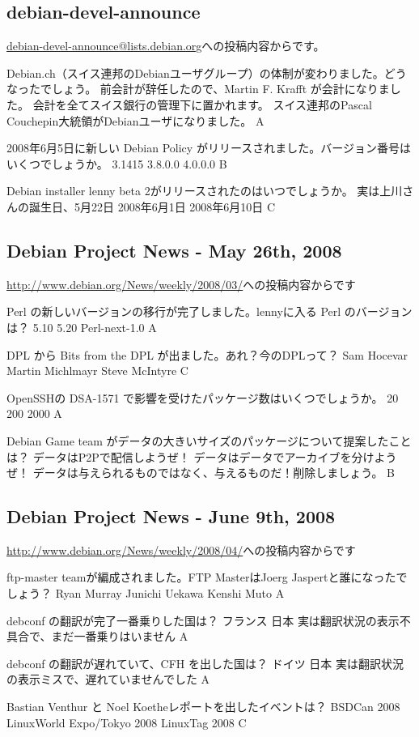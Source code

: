 \documentclass[mingoth,a4paper]{jsarticle}
\begin{document}
\begin{multicols}{2}
 \subsection{debian-devel-announce}
 \url{debian-devel-announce@lists.debian.org}への投稿内容からです。

 \santaku
 {Debian.ch（スイス連邦のDebianユーザグループ）の体制が変わりました。どうなったでしょう。}
 {前会計が辞任したので、Martin F. Krafft が会計になりました。}
 {会計を全てスイス銀行の管理下に置かれます。}
 {スイス連邦のPascal Couchepin大統領がDebianユーザになりました。}
 {A}

 \santaku
 {2008年6月5日に新しい Debian Policy がリリースされました。バージョン番号はいくつでしょうか。}
 {3.1415}
 {3.8.0.0}
 {4.0.0.0}
 {B}
 
 \santaku
 {Debian installer lenny beta 2がリリースされたのはいつでしょうか。}
 {実は上川さんの誕生日、5月22日}
 {2008年6月1日}
 {2008年6月10日}
 {C}

 \subsection{Debian Project News - May 26th, 2008}
 \url{http://www.debian.org/News/weekly/2008/03/}への投稿内容からです

 \santaku
 {Perl の新しいバージョンの移行が完了しました。lennyに入る Perl のバージョンは？ }
 {5.10}
 {5.20}
 {Perl-next-1.0}
 {A}

 \santaku
 {DPL から Bits from the DPL が出ました。あれ？今のDPLって？}
 {Sam Hocevar}
 {Martin Michlmayr}
 {Steve McIntyre}
 {C}

 \santaku
 {OpenSSHの DSA-1571 で影響を受けたパッケージ数はいくつでしょうか。}
 {20}
 {200}
 {2000}
 {A}

 \santaku
 {Debian Game team がデータの大きいサイズのパッケージについて提案したことは？}
 {データはP2Pで配信しようぜ！}
 {データはデータでアーカイブを分けようぜ！}
 {データは与えられるものではなく、与えるものだ！削除しましょう。}
 {B}

 \subsection{Debian Project News - June 9th, 2008}
 \url{http://www.debian.org/News/weekly/2008/04/}への投稿内容からです

 \santaku
 {ftp-master teamが編成されました。FTP MasterはJoerg Jaspertと誰になったでしょう？}
 {Ryan Murray}
 {Junichi Uekawa}
 {Kenshi Muto}
 {A}

 \santaku
 {debconf の翻訳が完了一番乗りした国は？}
 {フランス}
 {日本}
 {実は翻訳状況の表示不具合で、まだ一番乗りはいません}
 {A}

 \santaku
 {debconf の翻訳が遅れていて、CFH を出した国は？}
 {ドイツ}
 {日本}
 {実は翻訳状況の表示ミスで、遅れていませんでした}
 {A}

 \santaku
 {Bastian Venthur と Noel Koetheレポートを出したイベントは？}
 {BSDCan 2008}
 {LinuxWorld Expo/Tokyo 2008}
 {LinuxTag 2008}
 {C}

\end{multicols}
\end{document}
